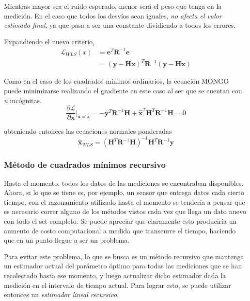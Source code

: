 Mientras mayor sea el ruido esperado, menor será el peso que tenga en la medición. En el caso que todos los desvíos sean iguales, \textit{no afecta el valor estimado final}, ya que pasa a ser una constante dividiendo a todos los errores.

Expandiendo el nuevo criterio,
\begin{align}
    \mathscr{L}_{WLS}(x) &= \bm{e}^T\bm{R}^{-1}\bm{e} \\
                         &= (\bm{y} - \bm{H}\bm{x})^T\bm{R}^{-1}(\bm{y}-\bm{H}\bm{x})
\end{align}

Como en el caso de los cuadrados mínimos ordinarios, la ecuación MONGO puede minimizarse realizando el gradiente en este caso al ser que se cuentan con \textit{n} incógnitas.
\begin{equation}
    \frac{\partial \mathscr{L}}{\partial \bm{x}}\bigg\rvert_{\bm{x}=\hat{\bm{x}}} = -\bm{y}^T\bm{R}^{-1}\bm{H} + \hat{\bm{x}}^T\bm{H}^T\bm{R}^{-1}\bm{H} = 0
\end{equation}

obteniendo entonces las ecuaciones normales ponderadas
\begin{equation}
    \hat{\bm{x}}_{WLS} = (\bm{H}^T\bm{R}^{-1}\bm{H})^{-1} \bm{H}^T\bm{R}^{-1}\bm{y}
\end{equation}

\subsubsection{Método de cuadrados mínimos recursivo}

Hasta el momento, todos los datos de las mediciones se encontraban disponibles. Ahora, si lo que se tiene es, por ejemplo, un sensor que entrega datos cada cierto tiempo, con el razonamiento utilizado hasta el momento se tendería a pensar que es necesario correr alguno de los métodos vistos cada vez que llega un dato nuevo con todo el set completo. Se puede apreciar que claramente esto produciría un aumento de costo computacional a medida que transcurre el tiempo, haciendo que en un punto llegue a ser un problema.

Para evitar este problema, lo que se busca es un método recursivo que mantenga un estimador actual del parámetro óptimo para todas las mediciones que se han recolectado hasta ese momento, y luego actualizar dicho estimador dada la medición en el intervalo de tiempo actual. Para lograr esto, se puede utilizar entonces un \textit{estimador lineal recursivo}.

